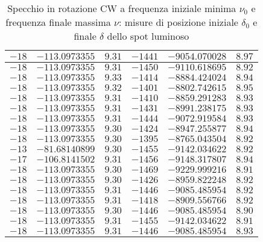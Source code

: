 \documentclass{article} %
\begin{document}
\begin{table}
\begin{tabular}{||c|c|c||c|c|c||}
            $-18 $ & $-113.0973355 $ & $ 9.31 $ & $ -1441 $ & $ -9054.070028 $ & $  8.97 $ \\\hline
            $-18 $ & $-113.0973355 $ & $ 9.31 $ & $ -1450 $ & $ -9110.618695 $ & $  8.92 $ \\\hline
            $-18 $ & $-113.0973355 $ & $ 9.33 $ & $ -1414 $ & $ -8884.424024 $ & $  8.94 $ \\\hline
            $-18 $ & $-113.0973355 $ & $ 9.32 $ & $ -1401 $ & $ -8802.742615 $ & $  8.95 $ \\\hline
            $-18 $ & $-113.0973355 $ & $ 9.31 $ & $ -1410 $ & $ -8859.291283 $ & $  8.93 $ \\\hline
            $-18 $ & $-113.0973355 $ & $ 9.31 $ & $ -1431 $ & $ -8991.238175 $ & $  8.93 $ \\\hline
            $-18 $ & $-113.0973355 $ & $ 9.31 $ & $ -1444 $ & $ -9072.919584 $ & $  8.93 $ \\\hline
            $-18 $ & $-113.0973355 $ & $ 9.30 $ & $ -1424 $ & $ -8947.255877 $ & $  8.94 $ \\\hline
            $-18 $ & $-113.0973355 $ & $ 9.30 $ & $ -1395 $ & $ -8765.043504 $ & $  8.92 $ \\\hline
            $-13 $ & $-81.68140899 $ & $ 9.30 $ & $ -1455 $ & $ -9142.034622 $ & $  8.92 $ \\\hline
            $-17 $ & $-106.8141502 $ & $ 9.31 $ & $ -1456 $ & $ -9148.317807 $ & $  8.94 $ \\\hline
            $-18 $ & $-113.0973355 $ & $ 9.30 $ & $ -1469 $ & $ -9229.999216 $ & $  8.91 $ \\\hline
            $-18 $ & $-113.0973355 $ & $ 9.30 $ & $ -1426 $ & $ -8959.822248 $ & $  8.92 $ \\\hline
            $-18 $ & $-113.0973355 $ & $ 9.31 $ & $ -1446 $ & $ -9085.485954 $ & $  8.92 $ \\\hline
            $-18 $ & $-113.0973355 $ & $ 9.31 $ & $ -1418 $ & $ -8909.556766 $ & $  8.92 $ \\\hline
            $-18 $ & $-113.0973355 $ & $ 9.30 $ & $ -1446 $ & $ -9085.485954 $ & $  8.90 $ \\\hline
            $-18 $ & $-113.0973355 $ & $ 9.31 $ & $ -1455 $ & $ -9142.034622 $ & $  8.91 $ \\\hline
            $-18 $ & $-113.0973355 $ & $ 9.31 $ & $ -1446 $ & $ -9085.485954 $ & $  8.93 $ \\\hline
        \end{tabular}
        \caption{Specchio in rotazione CW a frequenza iniziale minima $\nu_0$ e frequenza finale massima $\nu$: misure di posizione iniziale $\delta_0$ e finale $\delta$ dello spot luminoso}
        \label{CW_min_max}
    \end{table}
\end{document}
